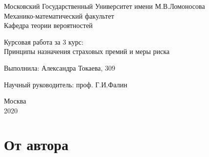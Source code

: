 \documentclass[12pt,a4paper]{article}
\begin{document}
\begin{titlepage}

 \begin{center}
 Московский Государственный Университет имени М.В.Ломоносова \\
Механико-математический факультет\\
Кафедра теории вероятностей
  \end{center}

 \vspace{3cm}
 
 \begin{center}
   
  {  Курсовая работа за 3 курс:\\
  Принципы назначения страховых премий и меры риска}
   
    \vspace{5cm}
\end{center}     
   
     
   \hspace{170pt}  {Выполнила: Александра Токаева,  309 \\}
       
 \vspace{0.1cm}
  \hspace{170pt} 	  Научный руководитель:  проф. Г.И.Фалин\\

\vspace{4cm}

  \begin{center}
  {Москва\\
  2020}
  \end{center}  
  
\newpage
\tableofcontents
 
 
\end{titlepage}

\section{ От автора}
\end{document}
